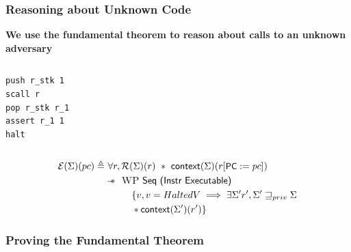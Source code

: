 \documentclass{beamer}
\newcommand{\sep}{-\kern-.6em\raisebox{-.659ex}{*}\ }
\newcommand{\interp}[2]{(#1)(#2)}
\begin{document}
\begin{frame}[fragile]
\frametitle{Reasoning about Unknown Code}
\textbf{We use the fundamental theorem to reason about calls to an unknown adversary}

\begin{columns}[c]


\begin{center}
\begin{lstlisting}
push r_stk 1
scall r 
pop r_stk r_1
assert r_1 1
halt
\end{lstlisting}
\end{center}

\end{columns}

\begin{align*}
 		\mathcal{E}\interp{\Sigma}{pc} \triangleq&~\forall r, \mathcal{R}(\Sigma)(r) ~*~{\textsf{context}(\Sigma)(r[\textsf{\small PC}:=pc])}\\
 		&\sep~\textsc{WP}~\textsf{Seq (Instr Executable)}~\\
 		&\hspace{1cm}\{ v, v = HaltedV \implies \exists \Sigma ' r', \Sigma ' \sqsupseteq_{priv} \Sigma \\
 		&\hspace{1cm}* {\textsf{context}(\Sigma ')(r')}\}
 	\end{align*}

\end{frame}


\begin{frame}
\frametitle{Proving the Fundamental Theorem}


\end{frame}
	
\end{document}
